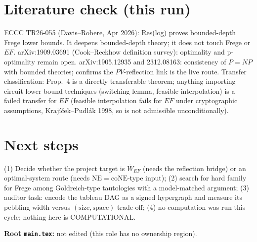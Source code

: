 \documentclass{article}
\begin{document}
\section{Literature check (this run)}
ECCC TR26-055 (Davis--Robere, Apr 2026): Res(log) proves bounded-depth Frege lower bounds. It deepens bounded-depth theory; it does not touch Frege or $EF$. arXiv:1909.03691 (Cook--Reckhow definition survey): optimality and p-optimality remain open. arXiv:1905.12935 and 2312.08163: consistency of $P=NP$ with bounded theories; confirms the $PV$-reflection link is the live route. Transfer classification: Prop.~4 is a directly transferable theorem; anything importing circuit lower-bound techniques (switching lemma, feasible interpolation) is a failed transfer for $EF$ (feasible interpolation fails for $EF$ under cryptographic assumptions, Krajíček--Pudlák 1998, so is not admissible unconditionally).

\section{Next steps}
(1) Decide whether the project target is $\overline W_{EF}$ (needs the reflection bridge) or an optimal-system route (needs $\mathrm{NE}=\mathrm{coNE}$-type input); (2) search for hard family for Frege among Goldreich-type tautologies with a model-matched argument; (3) auditor task: encode the tableau DAG as a signed hypergraph and measure its pebbling width versus $(\text{size},\text{space})$ trade-off; (4) no computation was run this cycle; nothing here is COMPUTATIONAL.

\noindent\textbf{Root \texttt{main.tex}:} not edited (this role has no ownership region).
\end{document}
